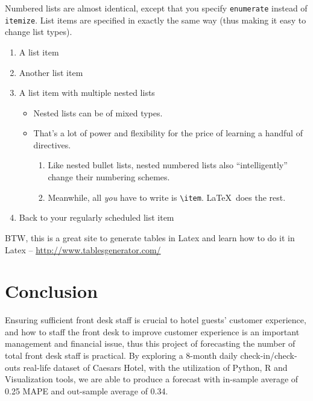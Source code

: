 \documentclass{article}
\begin{document}
Numbered lists are almost identical, except that you specify \verb!enumerate! instead of \verb!itemize!.  List items are specified in exactly the same way (thus making it easy to change list types).

\begin{enumerate}
\item A list item
\item Another list item
\item A list item with multiple nested lists

\begin{itemize}
\item Nested lists can be of mixed types.
\item That's a lot of power and flexibility for the price of learning a handful of directives.

\begin{enumerate}
\item Like nested bullet lists, nested numbered lists also ``intelligently'' change their numbering schemes.
\item Meanwhile, all \emph{you} have to write is \verb!\item!.  \LaTeX\ does the rest.
\end{enumerate}
\end{itemize}

\item Back to your regularly scheduled list item

\end{enumerate}

BTW, this is a great site to generate tables in Latex and learn how to do it in Latex -- \url{http://www.tablesgenerator.com/}


\section{Conclusion}

Ensuring sufficient front desk staff is crucial to hotel guests' customer experience, and how to staff the front desk to improve customer experience is an important management and financial issue, thus this project of forecasting the number of total front desk staff is practical. By exploring a 8-month daily check-in/check-outs real-life dataset of Caesars Hotel, with the utilization of Python, R and Visualization tools, we are able to produce a forecast with in-sample average of 0.25 MAPE and out-sample average of 0.34.
\end{document}
